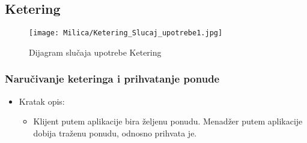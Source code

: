\documentclass[a4paper]{article}
\begin{document}

\subsection{Ketering}

  
\begin{figure}[H]
\centering
\texttt{[image: Milica/Ketering\_Slucaj\_upotrebe1.jpg]}
\caption{Dijagram slučaja upotrebe Ketering}
\label{fig:Ketering}
\end{figure}

\subsubsection{Naručivanje keteringa i prihvatanje ponude}
\begin{itemize}
    \item Kratak opis:
    \begin{itemize}
 
        \item Klijent putem aplikacije bira željenu ponudu. Menadžer putem aplikacije dobija traženu ponudu, odnosno prihvata je.
    \end{itemize}
    
    
\end{itemize}
\end{document}
